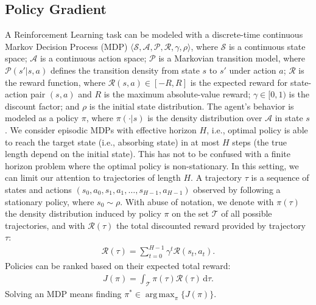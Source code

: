 \documentclass{article}
\makeatletter
\theoremstyle{remark}
\theoremstyle{definition}
\DeclareRobustCommand{\ie}{i.e.,\@\xspace}
\DeclareMathOperator*{\argmax}{arg\,max}
\newcommand{\de}{\,\mathrm{d}}
\newcommand{\Aspace}{\mathcal{A}}
\newcommand{\Sspace}{\mathcal{S}}
\newcommand{\Tspace}{\mathcal{T}}
\newcommand{\Transition}{\mathcal{P}}
\newcommand{\Reward}{\mathcal{R}}
\makeatother
\begin{document}
\subsection{Policy Gradient}
A Reinforcement Learning task \cite{sutton2011reinforcement} can be modeled with a discrete-time continuous Markov Decision Process (MDP) $\langle\Sspace,\Aspace,\Transition,\Reward,\gamma,\rho\rangle$, where $\Sspace$ is a continuous state space; $\Aspace$ is a continuous action space; $\Transition$ is a Markovian transition model, where $\Transition(s'|s,a)$ defines the transition density from state $s$ to $s'$ under action $a$; $\Reward$ is the reward function, where $\Reward(s,a) \in [-R,R]$ is the expected reward for state-action pair $(s,a)$ and $R$ is the maximum absolute-value reward; $\gamma\in[0,1)$ is the discount factor; and $\rho$ is the initial state distribution.
The agent's behavior is modeled as a policy $\pi$, where $\pi(\cdot|s)$ is the density distribution over $\Aspace$ in state $s$.
We consider episodic MDPs with effective horizon $H$, \ie optimal policy is able to reach the target state (\ie absorbing state) in at most $H$ steps (the true length depend on the initial state). This has not to be confused with a finite horizon problem where the optimal policy is non-stationary. In this setting, we can limit our attention to trajectories of length $H$. A trajectory $\tau$ is a sequence of states and actions $(s_0,a_0,s_1,a_1,\dots,s_{H-1},a_{H-1})$ observed by following a stationary policy, where $s_0 \sim \rho$.
With abuse of notation, we denote with $\pi(\tau)$ the density distribution induced by policy $\pi$ on the set $\Tspace$ of all possible trajectories, and with $\Reward(\tau)$ the total discounted reward provided by trajectory $\tau$:
\begin{align*}
\Reward(\tau) = \sum_{t=0}^{H-1}\gamma^t\Reward(s_t,a_t).
\end{align*}
Policies can be ranked based on their expected total reward:
\begin{align*}
	J(\pi) = \int_{\Tspace}\pi(\tau)\Reward(\tau)\de \tau.
\end{align*}
Solving an MDP means finding $\pi^* \in \argmax_{\pi} \{J(\pi)\}$.
\end{document}
